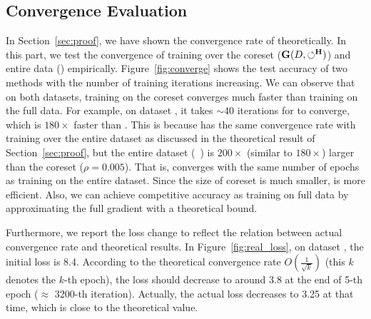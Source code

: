 \vspace{-0.5em}
\subsection{Convergence Evaluation}

In Section~\ref{sec:proof}, we have shown  the convergence rate of \ours theoretically. In this part, we test the convergence of training over the coreset ($\mathbf{G}(D,\circlearrowleft^\mathbf{H})$) and entire data (\truth) empirically.  Figure~\ref{fig:converge} shows the test accuracy of two methods with the number of training iterations increasing. We can observe that on both datasets, training on the coreset converges much faster than training on the full data. 
For example, on dataset \adult, it takes $\sim$40 iterations for \ours to converge, which is  $180\times$ faster than {\truth}. This is because \ours has the same convergence rate with training over the entire dataset as discussed in the theoretical result of Section~\ref{sec:proof}, but the entire dataset (\eg  ~\adult) is $200\times$ (similar to $180\times$) larger than the coreset ($\rho=0.005$).
 That is, \ours converges with the same number of epochs  as training on the entire dataset. Since the size of coreset is much smaller, \ours is more efficient. Also, we can achieve competitive accuracy as training on full data by approximating the full gradient with a theoretical bound. 
 


Furthermore, we report the loss change to reflect the relation between  actual convergence rate and theoretical results. In Figure~\ref{fig:real_loss}, on dataset \adult, the initial loss is 8.4. According to the theoretical convergence rate $O(\frac{1}{\sqrt{k}})$ (this $k$ denotes the $k$-th epoch),  the loss should decrease to around 3.8 at the end of 5-th epoch ($\approx$ 3200-th iteration). Actually,  the  actual loss decreases to 3.25 at that time, which is close to the theoretical value.

